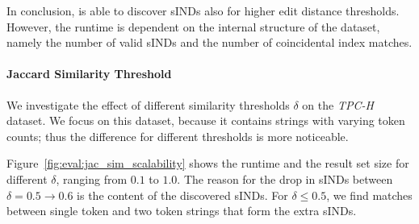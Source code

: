 %

In conclusion, \sawfish is able to discover sINDs also for higher edit distance thresholds.
However, the runtime is dependent on the internal structure of the dataset, namely the number of valid sINDs and the number of coincidental index matches.

\paragraph{Jaccard Similarity Threshold}
We investigate the effect of different similarity thresholds $\delta$ on the \emph{TPC-H} dataset.
We focus on this dataset, because it contains strings with varying token counts; thus the difference for different thresholds is more noticeable.

Figure~\ref{fig:eval:jac_sim_scalability} shows the runtime and the result set size for different $\delta$, ranging from $0.1$ to $1.0$.
The reason for the drop in sINDs between $\delta = 0.5 \to 0.6$ is the content of the discovered sINDs.
For $\delta \leq 0.5$, we find matches between single token and two token strings that form the extra sINDs.

